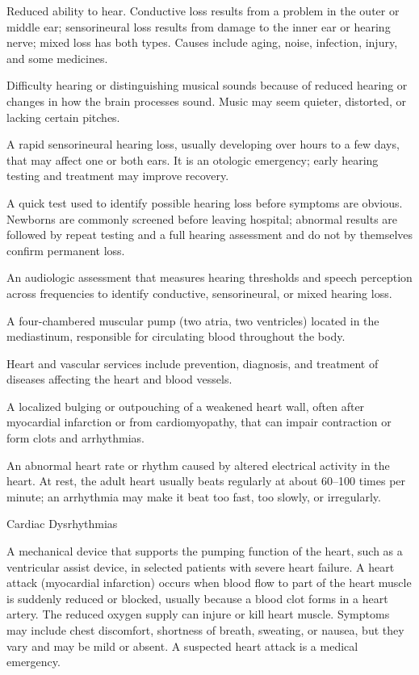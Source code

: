  Reduced ability to hear. Conductive loss results from a problem in the outer or middle ear; sensorineural loss results from damage to the inner ear or hearing nerve; mixed loss has both types. Causes include aging, noise, infection, injury, and some medicines.

 Difficulty hearing or distinguishing musical sounds because of reduced hearing or changes in how the brain processes sound. Music may seem quieter, distorted, or lacking certain pitches.

 A rapid sensorineural hearing loss, usually developing over hours to a few days, that may affect one or both ears. It is an otologic emergency; early hearing testing and treatment may improve recovery.

 A quick test used to identify possible hearing loss before symptoms are obvious. Newborns are commonly screened before leaving hospital; abnormal results are followed by repeat testing and a full hearing assessment and do not by themselves confirm permanent loss.

 An audiologic assessment that measures hearing thresholds and speech perception across frequencies to identify conductive, sensorineural, or mixed hearing loss.

 A four-chambered muscular pump (two atria, two ventricles) located in the mediastinum,
responsible for circulating blood throughout the body.

 Heart and vascular services include prevention, diagnosis, and treatment of diseases affecting the heart and blood vessels.

 A localized bulging or outpouching of a weakened heart wall, often after myocardial infarction or from cardiomyopathy, that can impair contraction or form clots and arrhythmias.

 An abnormal heart rate or rhythm caused by altered electrical activity in the heart. At rest, the adult heart usually beats regularly at about 60--100 times per minute; an arrhythmia may make it beat too fast, too slowly, or irregularly.

\synonyms
Cardiac Dysrhythmias

 A mechanical device that supports the pumping function of the heart, such as a ventricular assist device, in selected patients with severe heart failure.
 A heart attack (myocardial infarction) occurs when blood flow to part of the heart muscle is suddenly reduced or blocked, usually because a blood clot forms in a heart artery. The reduced oxygen supply can injure or kill heart muscle. Symptoms may include chest discomfort, shortness of breath, sweating, or nausea, but they vary and may be mild or absent. A suspected heart attack is a medical emergency.

